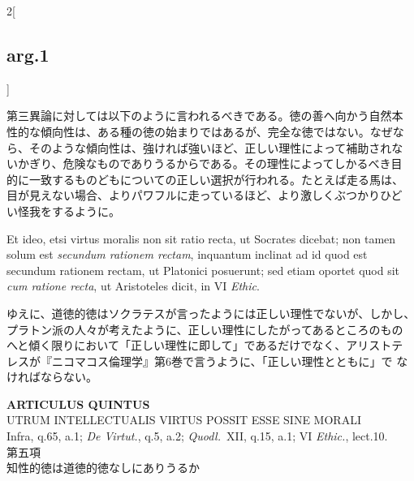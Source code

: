\documentclass[paper=a4paper,fontsize=10pt,jafontsize=9pt,titlepage]{jlreq}
\begin{document}
\begin{paracol}{2}[\subsection{arg.1}]
\switchcolumn

第三異論に対しては以下のように言われるべきである。徳の善へ向かう自然本
性的な傾向性は、ある種の徳の始まりではあるが、完全な徳ではない。なぜな
ら、そのような傾向性は、強ければ強いほど、正しい理性によって補助されな
いかぎり、危険なものでありうるからである。その理性によってしかるべき目
的に一致するものどもについての正しい選択が行われる。たとえば走る馬は、
目が見えない場合、よりパワフルに走っているほど、より激しくぶつかりひど
い怪我をするように。

\switchcolumn*

Et ideo, etsi virtus moralis non sit ratio recta, ut Socrates dicebat;
non tamen solum est {\itshape secundum rationem rectam}, inquantum
inclinat ad id quod est secundum rationem rectam, ut Platonici
posuerunt; sed etiam oportet quod sit {\itshape cum ratione recta}, ut
Aristoteles dicit, in VI {\itshape Ethic}.

\switchcolumn

ゆえに、道徳的徳はソクラテスが言ったようには正しい理性でないが、しかし、
プラトン派の人々が考えたように、正しい理性にしたがってあるところのもの
へと傾く限りにおいて「正しい理性に即して」であるだけでなく、アリストテ
レスが『ニコマコス倫理学』第6巻で言うように、「正しい理性とともに」で
なければならない。

\end{paracol}
\newpage
{}
{}
\setcounter{section}{5}
\setcounter{subsection}{0}



\begin{center}
{\Large {\bfseries ARTICULUS QUINTUS}}\\
{\large UTRUM INTELLECTUALIS VIRTUS POSSIT ESSE SINE MORALI}\\
{\footnotesize Infra, q.65, a.1; {\itshape De Virtut.}, q.5, a.2; {\itshape Quodl.}~XII, q.15, a.1; VI {\itshape Ethic.}, lect.10.}\\
{\Large 第五項\\知性的徳は道徳的徳なしにありうるか}
\end{center}
\end{document}
